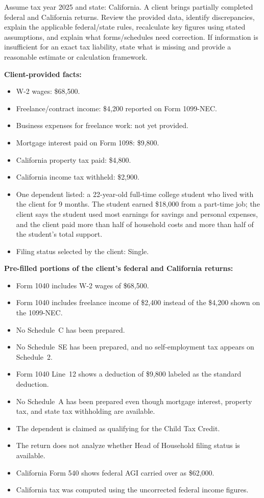 \begin{tcolorbox}[taskprompt, title=Task Prompt — Tax Preparation]
Assume tax year 2025 and state: California. A client brings partially completed federal and California returns. Review the provided data, identify discrepancies, explain the applicable federal/state rules, recalculate key figures using stated assumptions, and explain what forms/schedules need correction. If information is insufficient for an exact tax liability, state what is missing and provide a reasonable estimate or calculation framework.

\medskip
\textbf{Client-provided facts:}
\begin{itemize}
  \setlength{\itemsep}{1pt}
  \item W-2 wages: \$68,500.
  \item Freelance/contract income: \$4,200 reported on Form 1099-NEC.
  \item Business expenses for freelance work: not yet provided.
  \item Mortgage interest paid on Form 1098: \$9,800.
  \item California property tax paid: \$4,800.
  \item California income tax withheld: \$2,900.
  \item One dependent listed: a 22-year-old full-time college student who lived with the client for 9 months. The student earned \$18,000 from a part-time job; the client says the student used most earnings for savings and personal expenses, and the client paid more than half of household costs and more than half of the student's total support.
  \item Filing status selected by the client: Single.
\end{itemize}

\medskip
\textbf{Pre-filled portions of the client's federal and California returns:}
\begin{itemize}
  \setlength{\itemsep}{1pt}
  \item Form 1040 includes W-2 wages of \$68,500.
  \item Form 1040 includes freelance income of \$2,400 instead of the \$4,200 shown on the 1099-NEC.
  \item No Schedule~C has been prepared.
  \item No Schedule~SE has been prepared, and no self-employment tax appears on Schedule~2.
  \item Form 1040 Line~12 shows a deduction of \$9,800 labeled as the standard deduction.
  \item No Schedule~A has been prepared even though mortgage interest, property tax, and state tax withholding are available.
  \item The dependent is claimed as qualifying for the Child Tax Credit.
  \item The return does not analyze whether Head of Household filing status is available.
  \item California Form 540 shows federal AGI carried over as \$62,000.
  \item California tax was computed using the uncorrected federal income figures.
\end{itemize}


\end{tcolorbox}
